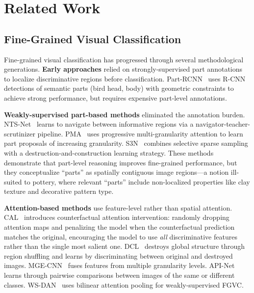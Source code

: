 \documentclass[10pt,twocolumn,letterpaper]{article}
\begin{document}
\section{Related Work}
\label{sec:related}

\subsection{Fine-Grained Visual Classification}

Fine-grained visual classification has progressed through several methodological generations. \textbf{Early approaches} relied on strongly-supervised part annotations~\cite{zhang2014part, branson2014bird} to localize discriminative regions before classification. Part-RCNN~\cite{zhang2014part} uses R-CNN detections of semantic parts (bird head, body) with geometric constraints to achieve strong performance, but requires expensive part-level annotations.

\textbf{Weakly-supervised part-based methods} eliminated the annotation burden. NTS-Net~\cite{yang2018learning} learns to navigate between informative regions via a navigator-teacher-scrutinizer pipeline. PMA~\cite{du2020fine} uses progressive multi-granularity attention to learn part proposals of increasing granularity. S3N~\cite{ding2019selective} combines selective sparse sampling with a destruction-and-construction learning strategy. These methods demonstrate that part-level reasoning improves fine-grained performance, but they conceptualize ``parts'' as spatially contiguous image regions---a notion ill-suited to pottery, where relevant ``parts'' include non-localized properties like clay texture and decorative pattern type.

\textbf{Attention-based methods} use feature-level rather than spatial attention. CAL~\cite{rao2021counterfactual} introduces counterfactual attention intervention: randomly dropping attention maps and penalizing the model when the counterfactual prediction matches the original, encouraging the model to use \emph{all} discriminative features rather than the single most salient one. DCL~\cite{chen2019destruction} destroys global structure through region shuffling and learns by discriminating between original and destroyed images. MGE-CNN~\cite{zhang2020multi} fuses features from multiple granularity levels. API-Net~\cite{zhuang2020attentive} learns through pairwise comparisons between images of the same or different classes. WS-DAN~\cite{hu2019weakly} uses bilinear attention pooling for weakly-supervised FGVC.
\end{document}
